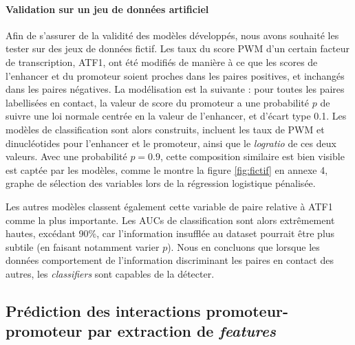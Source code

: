 \documentclass[french]{llncs}
\begin{document}
\paragraph{Validation sur un jeu de données artificiel}
 Afin de s'assurer de la validité des modèles développés, nous avons souhaité les tester sur des jeux de données fictif. Les taux du score PWM d'un certain facteur de transcription, ATF1, ont été modifiés de manière à ce que les scores de l'enhancer et du promoteur soient proches dans les paires positives, et inchangés dans les paires négatives. La modélisation est la suivante : pour toutes les paires labellisées en contact, la valeur de score du promoteur a une probabilité $p$ de suivre une loi normale centrée en la valeur de l'enhancer, et d'écart type 0.1. Les modèles de classification sont alors construits, incluent les taux de PWM et dinucléotides pour l'enhancer et le promoteur, ainsi que le \textit{logratio} de ces deux valeurs. Avec une probabilité $p = 0.9$, cette composition similaire est bien visible est captée par les modèles, comme le montre la figure \ref{fig:fictif} en annexe 4, graphe de sélection des variables lors de la régression logistique pénalisée.


Les autres modèles classent également cette variable de paire relative à ATF1 comme la plus importante. Les AUCs de classification sont alors extrêmement hautes, excédant 90\%, car l'information insufflée au dataset pourrait être plus subtile (en faisant notamment varier $p$). Nous en concluons que lorsque les données comportement de l'information discriminant les paires en contact des autres, les \textit{classifiers} sont capables de la détecter.

\subsection{Prédiction des interactions promoteur-promoteur par extraction de \textit{features}}\label{section:res_dextra}
\end{document}
